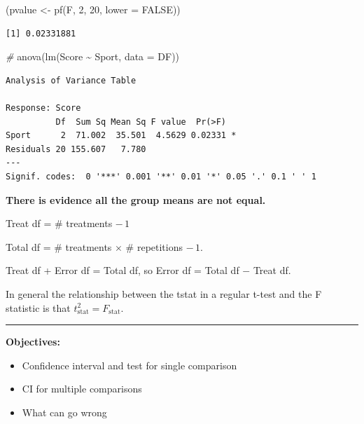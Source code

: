 \documentclass[
]{article}
\newenvironment{Shaded}{\begin{snugshade}}{\end{snugshade}}
\newcommand{\AttributeTok}[1]{\textcolor[rgb]{0.77,0.63,0.00}{#1}}
\newcommand{\CommentTok}[1]{\textcolor[rgb]{0.56,0.35,0.01}{\textit{#1}}}
\newcommand{\ConstantTok}[1]{\textcolor[rgb]{0.00,0.00,0.00}{#1}}
\newcommand{\DecValTok}[1]{\textcolor[rgb]{0.00,0.00,0.81}{#1}}
\newcommand{\FunctionTok}[1]{\textcolor[rgb]{0.00,0.00,0.00}{#1}}
\newcommand{\NormalTok}[1]{#1}
\newcommand{\OtherTok}[1]{\textcolor[rgb]{0.56,0.35,0.01}{#1}}
\newcommand{\SpecialCharTok}[1]{\textcolor[rgb]{0.00,0.00,0.00}{#1}}
\begin{document}
\begin{Shaded}
\begin{Highlighting}[]
\NormalTok{(pvalue }\OtherTok{\textless{}{-}} \FunctionTok{pf}\NormalTok{(F, }\DecValTok{2}\NormalTok{, }\DecValTok{20}\NormalTok{, }\AttributeTok{lower =} \ConstantTok{FALSE}\NormalTok{))}
\end{Highlighting}
\end{Shaded}

\begin{verbatim}
[1] 0.02331881
\end{verbatim}

\begin{Shaded}
\begin{Highlighting}[]
\CommentTok{\#}
\FunctionTok{anova}\NormalTok{(}\FunctionTok{lm}\NormalTok{(Score }\SpecialCharTok{\textasciitilde{}}\NormalTok{ Sport, }\AttributeTok{data =}\NormalTok{ DF))}
\end{Highlighting}
\end{Shaded}

\begin{verbatim}
Analysis of Variance Table

Response: Score
          Df  Sum Sq Mean Sq F value  Pr(>F)  
Sport      2  71.002  35.501  4.5629 0.02331 *
Residuals 20 155.607   7.780                  
---
Signif. codes:  0 '***' 0.001 '**' 0.01 '*' 0.05 '.' 0.1 ' ' 1
\end{verbatim}

\textbf{There is evidence all the group means are not equal.}

Treat df = \# treatments \(-\, 1\)

Total df = \# treatments \(\times\) \# repetitions \(-\,1\).

Treat df + Error df = Total df, so Error df = Total df \(-\) Treat df.

In general the relationship between the tstat in a regular t-test and the F statistic is that \(t_\text{stat}^2 = F_\text{stat}\).

\begin{center}\rule{0.5\linewidth}{0.5pt}\end{center}

\textbf{Objectives:}

\begin{itemize}
\item
  Confidence interval and test for single comparison
\item
  CI for multiple comparisons
\item
  What can go wrong
\end{itemize}
\end{document}
